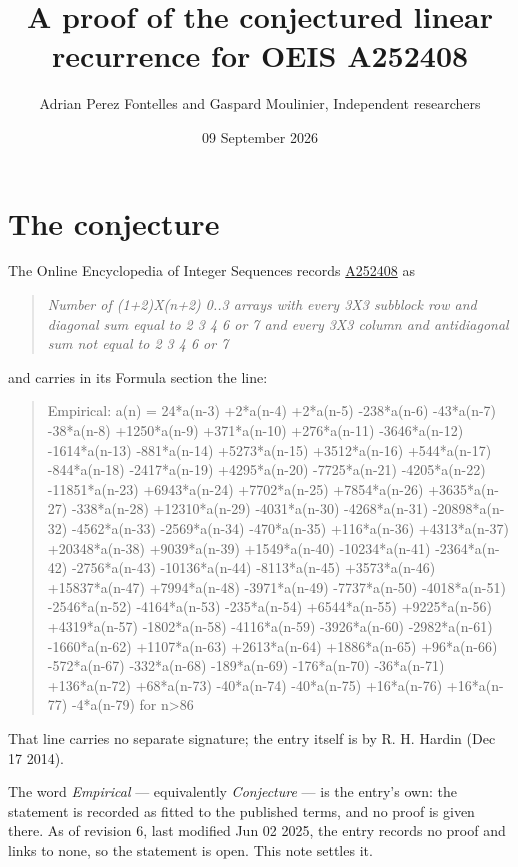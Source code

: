 \documentclass[11pt]{article}
\title{A proof of the conjectured linear recurrence for OEIS A252408}
\author{Adrian Perez Fontelles and Gaspard Moulinier, Independent researchers}
\date{09 September 2026}
\theoremstyle{definition}
\begin{document}
\maketitle
\section{The conjecture}

The Online Encyclopedia of Integer Sequences records \href{https://oeis.org/A252408}{A252408} as

\begin{quote}\itshape Number of (1+2)X(n+2) 0..3 arrays with every 3X3 subblock row and diagonal sum equal to 2 3 4 6 or 7 and every 3X3 column and antidiagonal sum not equal to 2 3 4 6 or 7\end{quote}

and carries in its Formula section the line:

\begin{quote}\ttfamily Empirical: a(n) = 24*a(n-3) +2*a(n-4) +2*a(n-5) -238*a(n-6) -43*a(n-7) -38*a(n-8) +1250*a(n-9) +371*a(n-10) +276*a(n-11) -3646*a(n-12) -1614*a(n-13) -881*a(n-14) +5273*a(n-15) +3512*a(n-16) +544*a(n-17) -844*a(n-18) -2417*a(n-19) +4295*a(n-20) -7725*a(n-21) -4205*a(n-22) -11851*a(n-23) +6943*a(n-24) +7702*a(n-25) +7854*a(n-26) +3635*a(n-27) -338*a(n-28) +12310*a(n-29) -4031*a(n-30) -4268*a(n-31) -20898*a(n-32) -4562*a(n-33) -2569*a(n-34) -470*a(n-35) +116*a(n-36) +4313*a(n-37) +20348*a(n-38) +9039*a(n-39) +1549*a(n-40) -10234*a(n-41) -2364*a(n-42) -2756*a(n-43) -10136*a(n-44) -8113*a(n-45) +3573*a(n-46) +15837*a(n-47) +7994*a(n-48) -3971*a(n-49) -7737*a(n-50) -4018*a(n-51) -2546*a(n-52) -4164*a(n-53) -235*a(n-54) +6544*a(n-55) +9225*a(n-56) +4319*a(n-57) -1802*a(n-58) -4116*a(n-59) -3926*a(n-60) -2982*a(n-61) -1660*a(n-62) +1107*a(n-63) +2613*a(n-64) +1886*a(n-65) +96*a(n-66) -572*a(n-67) -332*a(n-68) -189*a(n-69) -176*a(n-70) -36*a(n-71) +136*a(n-72) +68*a(n-73) -40*a(n-74) -40*a(n-75) +16*a(n-76) +16*a(n-77) -4*a(n-79) for n>86\end{quote}

That line carries no separate signature; the entry itself is by R. H. Hardin (Dec 17 2014).

The word {\itshape Empirical} --- equivalently {\itshape Conjecture} --- is the entry's own: the statement is recorded as fitted to the published terms, and no proof is given there. As of revision 6, last modified Jun 02 2025, the entry records no proof and links to none, so the statement is open. This note settles it.
\end{document}

